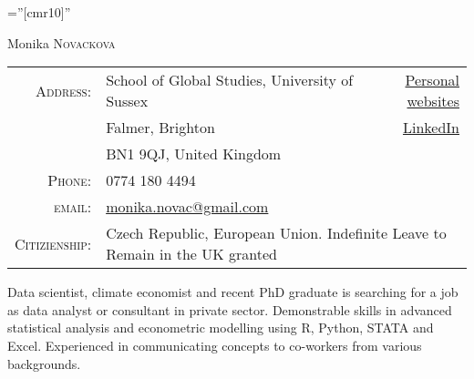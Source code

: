 \documentclass[a4paper,10pt]{article}
\begin{document}

\pagestyle{empty} %

\font\fb=''[cmr10]'' %

\par{\centering
		{\Huge Monika \textsc{Novackova}
	}\bigskip\par}


\begin{tabular}{rlr}
 
    \textsc{Address:}   & School of Global Studies, University of Sussex&  \href{https://monikanovackova.github.io/0}{Personal websites} \\
 & Falmer, Brighton&  \href{https://www.linkedin.com/in/monika-novackova/}{LinkedIn}\\
  &BN1 9QJ, United Kingdom\\
    \textsc{Phone:}     & 0774 180 4494\\
    \textsc{email:}     & \href{mailto:monika.novac@gmail.com}{monika.novac@gmail.com}    \\
    
       \textsc{Citizienship:} & \multicolumn{2}{l}{Czech Republic, European Union. Indefinite Leave to Remain in the UK granted}
\end{tabular}

Data scientist, climate economist and recent PhD graduate is searching for a job as data analyst or consultant in private sector. Demonstrable skills in advanced statistical analysis and econometric modelling using R, Python, STATA and Excel. Experienced in communicating concepts to co-workers from various backgrounds.



\end{document}
